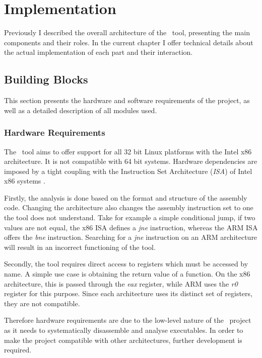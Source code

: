 \chapter{Implementation}
\label{chapter:implementation}

Previously I described the overall architecture of the \project\ tool, presenting the main components and their roles. In the current chapter I offer technical details about the actual implementation of each part and their interaction.

\section{Building Blocks}
\label{sec:building-blocks}

This section presents the hardware and software requirements of the project, as well as a detailed description of all modules used.

\subsection{Hardware Requirements}
\label{sub-sec:hardware-req}

The \project\ tool aims to offer support for all 32 bit Linux platforms with the Intel x86 architecture. It is not compatible with 64 bit systems. Hardware dependencies are imposed by a tight coupling with the Instruction Set Architecture (\textit{ISA}) of Intel x86 systems \cite{x86-fundamentals}.

Firstly, the analysis is done based on the format and structure of the assembly code. Changing the architecture also changes the assembly instruction set to one the tool does not understand. Take for example a simple conditional jump, if two values are not equal, the x86 ISA defines a \textit{jne} instruction, whereas the ARM ISA \cite{arm-manual} offers the \textit{bne} instruction. Searching for a \textit{jne} instruction on an ARM architecture will result in an incorrect functioning of the tool.

Secondly, the tool requires direct access to registers which must be accessed by name. A simple use case is obtaining the return value of a function. On the x86 architecture, this is passed through the \textit{eax} register, while ARM uses the \textit{r0} register for this purpose. Since each architecture uses its distinct set of registers, they are not compatible.

Therefore hardware requirements are due to the low-level nature of the \project\ project as it needs to systematically disassemble and analyse executables. In order to make the project compatible with other architectures, further development is required.

